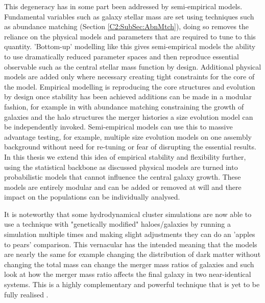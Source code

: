 This degeneracy has in some part been addressed by semi-empirical models. Fundamental variables such as galaxy stellar mass are set using techniques such as abundance matching (Section \ref{C2:SubSec:AbnMtch}), doing so removes the reliance on the physical models and parameters that are required to tune to this quantity. 'Bottom-up' modelling like this gives semi-empirical models the ability to use dramatically reduced parameter spaces and then reproduce essential observable such as the central stellar mass function by design. Additional physical models are added only where necessary creating tight constraints for the core of the model. Empirical modelling is reproducing the core structures and evolution
by design once stability has been achieved additions can be made in a modular fashion, for example in \citet{Shankar2014} with abundance matching constraining the growth of galaxies and the halo structures the merger histories a size evolution model can be independently invoked. Semi-empirical models can use this to massive advantage testing, for example, multiple size evolution models on one assembly background without need for re-tuning or fear of disrupting the essential results. In this thesis we extend this idea of empirical stability and flexibility further, using the statistical backbone as discussed physical models are turned into probabilistic models that cannot influence the central galaxy growth. These models are entirely modular and can be added or removed at will and there impact on the populations can be individually analysed. 

It is noteworthy that some hydrodynamical cluster simulations are now able to use a technique with "genetically modified" haloes/galaxies by running a simulation multiple times and making slight adjustments they can do an 'apples to pears' comparison. This vernacular has the intended meaning that the models are nearly the same for example changing the distribution of dark matter without changing the total mass can change the merger mass ratios of galaxies and such look at how the merger mass ratio affects the final galaxy in two near-identical systems. This is a highly complementary and powerful technique that is yet to be fully realised \cite{Rey2018QuadraticHistory}.

